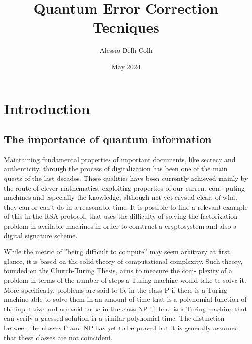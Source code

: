 \documentclass{article}
\title{Quantum Error Correction Tecniques}
\author{Alessio Delli Colli}
\date{May 2024}
\begin{document}
\maketitle

\newpage

\tableofcontents

\newpage

\section{Introduction}

\vspace{10pt}

\subsection{The importance of quantum information}

\vspace{10pt}

Maintaining fundamental properties of important documents, like secrecy
and authenticity, through the process of digitalization has been one of the main
quests of the last decades. These qualities have been currently achieved mainly
by the route of clever mathematics, exploiting properties of our current com-
puting machines and especially the knowledge, although not yet crystal clear,
of what they can or can’t do in a reasonable time.
It is possible to find a relevant example of this in the RSA protocol, that uses
the difficulty of solving the factorization problem in available machines in order
to construct a cryptosystem and also a digital signature scheme.

\vspace{10pt}

\noindent While the metric of ”being difficult to compute” may seem arbitrary at first
glance, it is based on the solid theory of computational complexity.
Such theory, founded on the Church-Turing Thesis, aims to measure the com-
plexity of a problem in terms of the number of steps a Turing machine would
take to solve it.
More specifically, problems are said to be in the class P if there is a Turing
machine able to solve them in an amount of time that is a polynomial function
of the input size and are said to be in the class NP if there is a Turing machine
that can verify a guessed solution in a similar polynomial time.
The distinction between the classes P and NP has yet to be proved but it is
generally assumed that these classes are not coincident.
\end{document}
